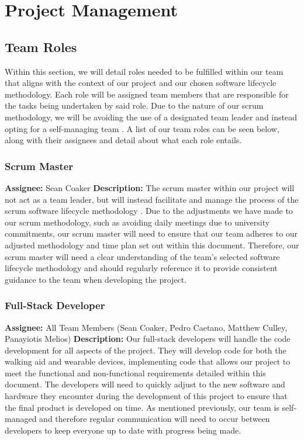 \chapter{Project Management}\label{ch:schedule}

    \section{Team Roles}
        Within this section, we will detail roles needed to be fulfilled within our team that aligns with the context of our project and our chosen software lifecycle methodology. Each role will be assigned team members that are responsible for the tasks being undertaken by said role. Due to the nature of our scrum methodology, we will be avoiding the use of a designated team leader and instead opting for a self-managing team \cite{parafianowicz_2019}. A list of our team roles can be seen below, along with their assignees and detail about what each role entails.

        \subsection{Scrum Master}
            \textbf{Assignee: } Sean Coaker\newline
            \textbf{Description: } The scrum master within our project will not act as a team leader, but will instead facilitate and manage the process of the scrum software lifecycle methodology \cite{bass_2014}. Due to the adjustments we have made to our scrum methodology, such as avoiding daily meetings due to university commitments, our scrum master will need to ensure that our team adheres to our adjusted methodology and time plan set out within this document. Therefore, our scrum master will need a clear understanding of the team's selected software lifecycle methodology and should regularly reference it to provide consistent guidance to the team when developing the project.

        \subsection{Full-Stack Developer}
            \textbf{Assignee: } All Team Members (Sean Coaker, Pedro Caetano, Matthew Culley, Panayiotis Melios)\newline
            \textbf{Description: } Our full-stack developers will handle the code development for all aspects of the project. They will develop code for both the walking aid and wearable devices, implementing code that allows our project to meet the functional and non-functional requirements detailed within this document. The developers will need to quickly adjust to the new software and hardware they encounter during the development of this project to ensure that the final product is developed on time. As mentioned previously, our team is self-managed and therefore regular communication will need to occur between developers to keep everyone up to date with progress being made.

